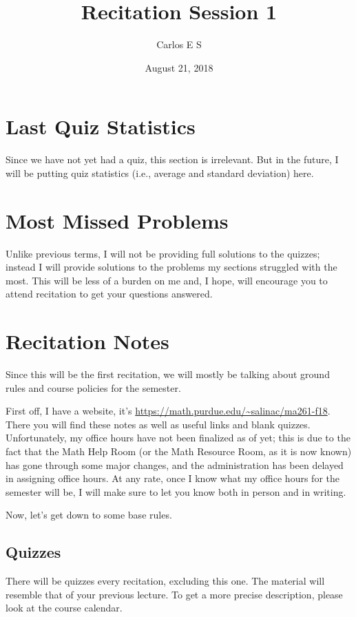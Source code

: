 \documentclass[12pt,letterpaper]{article}
\author{Carlos E S}
\date{August 21, 2018}
\title{Recitation Session 1}
\begin{document}
\maketitle
\tableofcontents


\section{Last Quiz Statistics}
\label{sec:orgbe3074b}
Since we have not yet had a quiz, this section is irrelevant. But in the
future, I will be putting quiz statistics (i.e., average and standard
deviation) here.

\section{Most Missed Problems}
\label{sec:orge582558}
Unlike previous terms, I will not be providing full solutions to the quizzes;
instead I will provide solutions to the problems my sections struggled with
the most. This will be less of a burden on me and, I hope, will encourage you
to attend recitation to get your questions answered.

\section{Recitation Notes}
\label{sec:org068df55}
Since this will be the first recitation, we will mostly be talking about
ground rules and course policies for the semester. 

First off, I have a website, it's \url{https://math.purdue.edu/\~salinac/ma261-f18}.
There you will find these notes as well as useful links and blank quizzes.
Unfortunately, my office hours have not been finalized as of yet; this is due
to the fact that the Math Help Room (or the Math Resource Room, as it is now
known) has gone through some major changes, and the administration has been
delayed in assigning office hours. At any rate, once I know what my office
hours for the semester will be, I will make sure to let you know both in
person and in writing.

Now, let's get down to some base rules. 

\subsection{Quizzes}
\label{sec:org97c786a}
There will be quizzes every recitation, excluding this one. The material will
resemble that of your previous lecture. To get a more precise description,
please look at the course calendar. 
\end{document}
